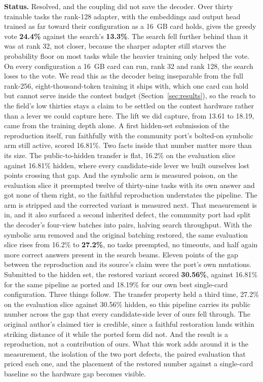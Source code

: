 \documentclass[11pt]{article}
\begin{document}
\textbf{Status.} Resolved, and the coupling did not save the decoder. Over thirty trainable tasks the rank-128
adapter, with the embeddings and output head trained as far toward their configuration as a 16~GB card holds,
gives the greedy vote \textbf{24.4\%} against the search's \textbf{13.3\%}. The search fell further behind than
it was at rank 32, not closer, because the sharper adapter still starves the probability floor on most tasks
while the heavier training only helped the vote. On every configuration a 16~GB card can run, rank 32 and
rank 128, the search loses to the vote. We read this as the decoder being inseparable from the full rank-256,
eight-thousand-token training it ships with, which one card can hold but cannot serve inside the contest
budget (Section~\ref{sec:results}), so the reach to the field's low thirties stays a claim to be settled on
the contest hardware rather than a lever we could capture here. The
lift we did capture, from 13.61 to 18.19, came from the training depth alone. A first hidden-set submission
of the reproduction itself, run faithfully with the community port's bolted-on symbolic arm still active,
scored 16.81\%. Two facts inside that number matter more than its size. The public-to-hidden transfer is
flat, 16.2\% on the evaluation slice against 16.81\% hidden, where every candidate-side lever we built
ourselves lost points crossing that gap. And the symbolic arm is measured poison, on the evaluation slice
it preempted twelve of thirty-nine tasks with its own answer and got none of them right, so the faithful
reproduction understates the pipeline. The arm is stripped and the corrected variant is measured next. That measurement is in, and it also surfaced
a second inherited defect, the community port had split the decoder's four-view batches into pairs, halving
search throughput. With the symbolic arm removed and the original batching restored, the same evaluation
slice rises from 16.2\% to \textbf{27.2\%}, no tasks preempted, no timeouts, and half again more correct
answers present in the search beams. Eleven points of the gap between the reproduction and its source's
claim were the port's own mutations. Submitted to the hidden set, the restored variant scored
\textbf{30.56\%}, against 16.81\% for the same pipeline as ported and 18.19\% for our own best
single-card configuration. Three things follow. The transfer property held a third time, 27.2\% on the
evaluation slice against 30.56\% hidden, so this pipeline carries its public number across the gap that
every candidate-side lever of ours fell through. The original author's claimed tier is credible, since
a faithful restoration lands within striking distance of it while the ported form did not. And the
result is a reproduction, not a contribution of ours. What this work adds around it is the measurement,
the isolation of the two port defects, the paired evaluation that priced each one, and the placement of
the restored number against a single-card baseline so the hardware gap becomes visible.
\end{document}
